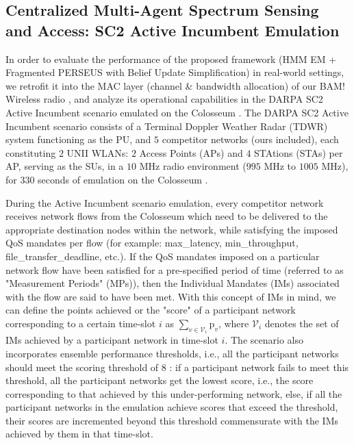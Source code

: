 \documentclass[12pt, draftcls, onecolumn]{IEEEtran}
\begin{document}
\subsection{Centralized Multi-Agent Spectrum Sensing and Access: SC2 Active Incumbent Emulation}\label{Y}
In order to evaluate the performance of the proposed framework (HMM EM + Fragmented PERSEUS with Belief Update Simplification) in real-world settings, we retrofit it into the MAC layer (channel \& bandwidth allocation) of our BAM! Wireless radio \cite{BAM}, and analyze its operational capabilities in the DARPA SC2 Active Incumbent scenario \cite{DARPA:ActiveIncumbent} emulated on the Colosseum \cite{DARPA:SC2c2api, DARPA:SC2scenarios}. The DARPA SC2 Active Incumbent scenario consists of a Terminal Doppler Weather Radar (TDWR) system functioning as the PU, and $5$ competitor networks (ours included), each constituting $2$ UNII WLANs: $2$ Access Points (APs) and $4$ STAtions (STAs) per AP, serving as the SUs, in a $10$ MHz radio environment ($995$ MHz to $1005$ MHz), for $330$ seconds of emulation on the Colosseum \cite{DARPA:ActiveIncumbent}.

During the Active Incumbent scenario emulation, every competitor network receives network flows from the Colosseum which need to be delivered to the appropriate destination nodes within the network, while satisfying the imposed QoS mandates per flow (for example: max\_latency, min\_throughput, file\_transfer\_deadline, etc.). If the QoS mandates imposed on a particular network flow have been satisfied for a pre-specified period of time (referred to as "Measurement Periods" (MPs)), then the Individual Mandates (IMs) associated with the flow are said to have been met. With this concept of IMs in mind, we can define the points achieved or the "score" of a participant network corresponding to a certain time-slot $i$ as $\sum_{v{\in}\mathcal{V}_{i}} \text{p}_{v}$, where $\mathcal{V}_{i}$ denotes the set of IMs achieved by a participant network in time-slot $i$. The scenario also incorporates ensemble performance thresholds, i.e., all the participant networks should meet the scoring threshold of $8$ \cite{DARPA:ActiveIncumbent}: if a participant network fails to meet this threshold, all the participant networks get the lowest score, i.e., the score corresponding to that achieved by this under-performing network, else, if all the participant networks in the emulation achieve scores that exceed the threshold, their scores are incremented beyond this threshold commensurate with the IMs achieved by them in that time-slot.
\end{document}
